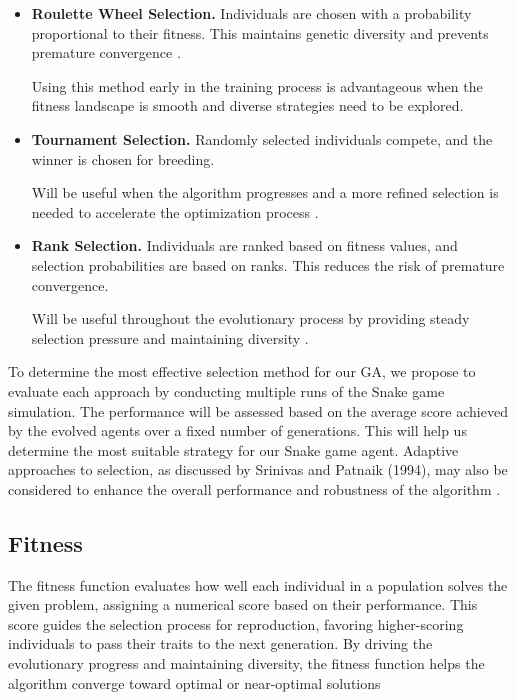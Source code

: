 \documentclass[a4paper, twocolumn]{article}
\begin{document}
\begin{itemize}
\item \textbf{Roulette Wheel Selection.}
Individuals are chosen with a probability proportional to their fitness. This maintains genetic diversity and prevents premature convergence \cite{goldberg1991comparative}.

Using this method early in the training process is advantageous when the fitness landscape is smooth and diverse strategies need to be explored.

\item \textbf{Tournament Selection.}
Randomly selected individuals compete, and the winner is chosen for breeding.

Will be useful when the algorithm progresses and a more refined selection is needed to accelerate the optimization process \cite{goldberg1991comparative}.

\item \textbf{Rank Selection.}
Individuals are ranked based on fitness values, and selection probabilities are based on ranks. This reduces the risk of premature convergence.

Will be useful throughout the evolutionary process by providing steady selection pressure and maintaining diversity \cite{srinvas1994adaptive}.

\end{itemize}

To determine the most effective selection method for our GA, we propose to evaluate each approach by conducting multiple runs of the Snake game simulation. The performance will be assessed based on the average score achieved by the evolved agents over a fixed number of generations. This will help us determine the most suitable strategy for our Snake game agent. Adaptive approaches to selection, as discussed by Srinivas and Patnaik (1994), may also be considered to enhance the overall performance and robustness of the algorithm \cite{srinvas1994adaptive}.

\subsection{Fitness\label{sec:Fitness}}
The fitness function evaluates how well each individual in a population solves the given problem, assigning a numerical score based on their performance. This score guides the selection process for reproduction, favoring higher-scoring individuals to pass their traits to the next generation. By driving the evolutionary progress and maintaining diversity, the fitness function helps the algorithm converge toward optimal or near-optimal solutions
\end{document}
